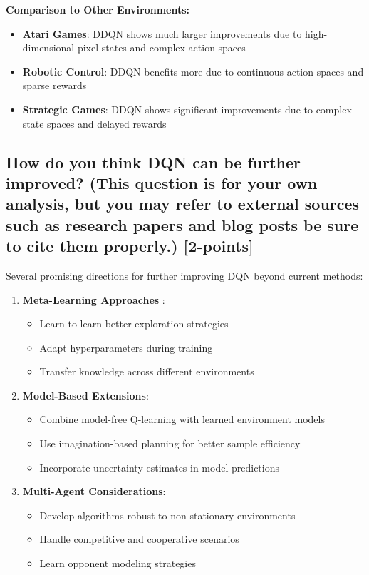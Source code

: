 \documentclass[12pt]{article}
\begin{document}
{{{\textbf{Comparison to Other Environments:}
\begin{itemize}
    \item \textbf{Atari Games}: DDQN shows much larger improvements due to high-dimensional pixel states and complex action spaces
    \item \textbf{Robotic Control}: DDQN benefits more due to continuous action spaces and sparse rewards
    \item \textbf{Strategic Games}: DDQN shows significant improvements due to complex state spaces and delayed rewards
\end{itemize}

\subsection{How do you think DQN can be further improved? (This question is for your own analysis, but you may refer to external sources such as research papers and blog posts be sure to cite them properly.) [2-points]}

Several promising directions for further improving DQN beyond current methods:

\begin{enumerate}
    \item \textbf{Meta-Learning Approaches} \cite{wang2016learning}:
    \begin{itemize}
        \item Learn to learn better exploration strategies
        \item Adapt hyperparameters during training
        \item Transfer knowledge across different environments
    \end{itemize}
    
    \item \textbf{Model-Based Extensions}:
    \begin{itemize}
        \item Combine model-free Q-learning with learned environment models
        \item Use imagination-based planning for better sample efficiency
        \item Incorporate uncertainty estimates in model predictions
    \end{itemize}
    
    \item \textbf{Multi-Agent Considerations}:
    \begin{itemize}
        \item Develop algorithms robust to non-stationary environments
        \item Handle competitive and cooperative scenarios
        \item Learn opponent modeling strategies
    \end{itemize}
    

\end{enumerate}}}}
\end{document}
